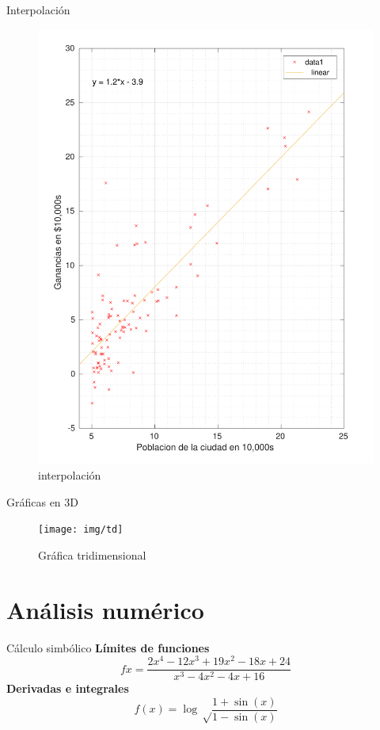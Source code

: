 \documentclass[10pt,xcolor={dvipsnames}]{beamer}
\begin{document}
\begin{frame}{Interpolación}{}
	\begin{figure}[ht]
	\includegraphics[scale=0.2]{img/regresion}
	\caption*{interpolación}
\end{figure}

\end{frame}

\begin{frame}{Gráficas en 3D}{}
	\begin{figure}[ht]
	\texttt{[image: img/td]}
	\caption*{Gráfica tridimensional}
\end{figure}
\end{frame}
\section{Análisis numérico}
\begin{frame}{Cálculo simbólico}{}
\textbf{Límites de funciones}
\[
	fx=\frac{2x^4-12x^3+19x^2-18x+24}{x^3-4x^2-4x+16}
\]
\textbf{Derivadas e integrales}
\[
f(x)=\log\sqrt\frac{1+\sin(x)}{1-\sin(x)}
\]
\end{frame}
\end{document}
